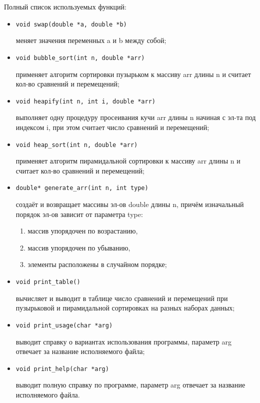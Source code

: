 \documentclass[a4paper,12pt,titlepage,finall]{article}
\begin{document}
Полный список используемых функций:
\begin{itemize}
\item \begin{verbatim}void swap(double *a, double *b)\end{verbatim} меняет значения переменных a и b между собой;
\item \begin{verbatim}void bubble_sort(int n, double *arr)\end{verbatim}применяет алгоритм сортировки пузырьком к массиву arr длины n и считает кол-во сравнений и перемещений;
\item \begin{verbatim}void heapify(int n, int i, double *arr)\end{verbatim} выполняет одну процедуру просеивания кучи arr длины n начиная с эл-та под индексом i, при этом считает число сравнений и перемещений;
\item \begin{verbatim}void heap_sort(int n, double *arr)\end{verbatim} применяет алгоритм пирамидальной сортировки к массиву arr длины n и считает кол-во сравнений и перемещений;
\item \begin{verbatim}double* generate_arr(int n, int type)\end{verbatim} создаёт и возвращает массивы эл-ов double длины n, причём изначальный порядок эл-ов зависит от параметра type: \begin{enumerate} \item массив упорядочен по возрастанию, \item массив упорядочен по убыванию, \item элементы расположены в случайном порядке; \end{enumerate}
\item \begin{verbatim}void print_table()\end{verbatim} вычисляет и выводит в таблице число сравнений и перемещений при пузырьковой и пирамидальной сортировках на разных наборах данных;
\item \begin{verbatim}void print_usage(char *arg)\end{verbatim} выводит справку о вариантах использования программы, параметр arg отвечает за название исполняемого файла;
\item \begin{verbatim}void print_help(char *arg)\end{verbatim} выводит полную справку по программе, параметр arg отвечает за название исполняемого файла.
\end{itemize}
\end{document}
